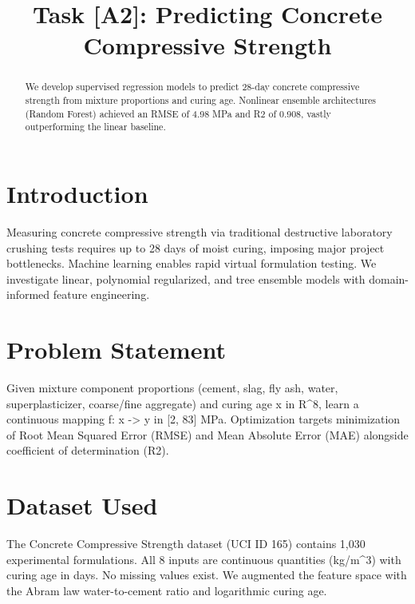 \documentclass[conference]{IEEEtran}
\begin{document}
\title{Task [A2]: Predicting Concrete Compressive Strength}

\author{
}

\maketitle

\begin{abstract}
We develop supervised regression models to predict 28-day concrete compressive strength from mixture proportions and curing age. Nonlinear ensemble architectures (Random Forest) achieved an RMSE of 4.98 MPa and R2 of 0.908, vastly outperforming the linear baseline.
\end{abstract}

\section{Introduction}
Measuring concrete compressive strength via traditional destructive laboratory crushing tests requires up to 28 days of moist curing, imposing major project bottlenecks. Machine learning enables rapid virtual formulation testing. We investigate linear, polynomial regularized, and tree ensemble models with domain-informed feature engineering.

\section{Problem Statement}
Given mixture component proportions (cement, slag, fly ash, water, superplasticizer, coarse/fine aggregate) and curing age x in R^8, learn a continuous mapping f: x -> y in [2, 83] MPa. Optimization targets minimization of Root Mean Squared Error (RMSE) and Mean Absolute Error (MAE) alongside coefficient of determination (R2).

\section{Dataset Used}
The Concrete Compressive Strength dataset (UCI ID 165) contains 1,030 experimental formulations. All 8 inputs are continuous quantities (kg/m^3) with curing age in days. No missing values exist. We augmented the feature space with the Abram law water-to-cement ratio and logarithmic curing age.
\end{document}

